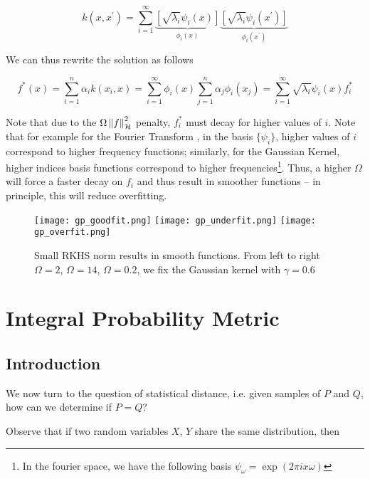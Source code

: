 $$
    k \left(x, x^{\prime}\right)=\sum_{i=1}^{\infty} 
    \underbrace{\left[\sqrt{\lambda_{i}} \psi_{i}(x)\right]}_{\phi_{i}(x)} 
    \underbrace{\left[\sqrt{\lambda_{i}} \psi_{i}\left(x^{\prime}\right)\right]}_{\phi_{i}\left(x^{\prime}\right)}
$$

We can thus rewrite the solution as follows

$$
    f^{*}(x) = \sum_{i=1}^{n} \alpha_{i} k\left(x_i, x\right) = 
    \sum_{i=1}^{\infty} \phi_i\left(x\right) 
    \sum_{j=1}^{n} \alpha_{j}  \phi_i\left(x_j\right) = 
    \sum_{i=1}^{\infty} \sqrt{\lambda_{i}} \psi_{i}(x) f^{*}_i 
$$

Note that due to the $\Omega \left\lVert f\right\rVert_{\mathcal{H}}^{2}$ penalty, $f^{*}_i$ must decay for higher values of $i$. Note that
for example for the Fourier Transform
, in the basis $\{\psi_i\}$, higher values of $i$ correspond to higher 
frequency functions; similarly, for the Gaussian Kernel, higher indices basis functions correspond to 
higher frequencies\footnote{In the fourier space, we have the following
basis $\psi_\omega = \exp (2\pi i x \omega)$}. Thus, a higher $\Omega$ will force a faster decay on $f_i$ and thus result in smoother functions
-- in principle, this will reduce overfitting. 

\begin{figure}[H]

    \centering
    \texttt{[image: gp\_goodfit.png]} 
    \texttt{[image: gp\_underfit.png]} 
    \texttt{[image: gp\_overfit.png]} 
    \caption{Small RKHS norm results in smooth functions. 
    From left to right $\Omega = 2$, $\Omega = 14$, $\Omega = 0.2$, 
    we fix the Gaussian kernel with $\gamma = 0.6$}
    \label{fig:kernel_smoothness}  
\end{figure}


\section{Integral Probability Metric}

\subsection{Introduction}

We now turn to the question of statistical distance, i.e. given samples of $P$ and
$Q$, how can we determine if $P = Q$?

Observe that if two random variables $X$, $Y$ share the same distribution, then 


